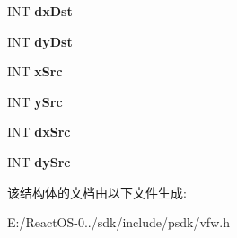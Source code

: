 \begin{DoxyCompactItemize}
\item 
\mbox{\label{struct_i_c_d_e_c_o_m_p_r_e_s_s_e_x_a097b5d752452f6e70df2113ac2f42d3a}} 
I\+NT {\bfseries dx\+Dst}
\item 
\mbox{\label{struct_i_c_d_e_c_o_m_p_r_e_s_s_e_x_ac307419bec7cdf92719c5556c3943ae0}} 
I\+NT {\bfseries dy\+Dst}
\item 
\mbox{\label{struct_i_c_d_e_c_o_m_p_r_e_s_s_e_x_a85bdea499f5c75feaa805682309bf4ae}} 
I\+NT {\bfseries x\+Src}
\item 
\mbox{\label{struct_i_c_d_e_c_o_m_p_r_e_s_s_e_x_a38ec4435656b1dc41d23bffbf2f4f2f8}} 
I\+NT {\bfseries y\+Src}
\item 
\mbox{\label{struct_i_c_d_e_c_o_m_p_r_e_s_s_e_x_a8f7a0a52f994d06f3f5883d9dfa19b0c}} 
I\+NT {\bfseries dx\+Src}
\item 
\mbox{\label{struct_i_c_d_e_c_o_m_p_r_e_s_s_e_x_a4e0e2f5ec73cf8d4ca83409808f13d06}} 
I\+NT {\bfseries dy\+Src}
\end{DoxyCompactItemize}


该结构体的文档由以下文件生成\+:\begin{DoxyCompactItemize}
\item 
E\+:/\+React\+O\+S-\/0../sdk/include/psdk/vfw.\+h\end{DoxyCompactItemize}
